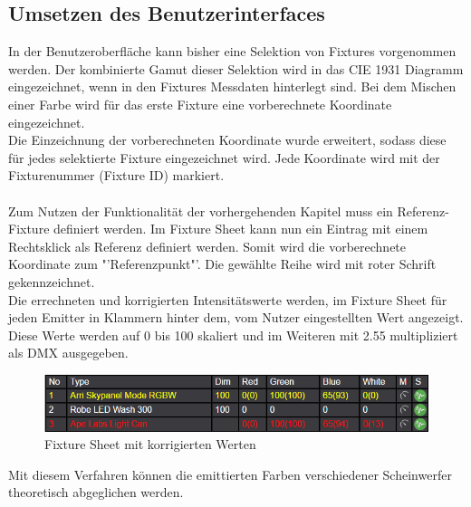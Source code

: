 \documentclass[11pt]{scrartcl}
\begin{document}
\subsection{Umsetzen des Benutzerinterfaces}
In der Benutzeroberfläche kann bisher eine Selektion von Fixtures vorgenommen werden. Der kombinierte Gamut dieser Selektion wird in das CIE 1931 Diagramm
eingezeichnet, wenn in den Fixtures Messdaten hinterlegt sind. Bei dem Mischen einer Farbe wird für das erste Fixture eine vorberechnete Koordinate
eingezeichnet.\\
Die Einzeichnung der vorberechneten Koordinate wurde erweitert, sodass diese für jedes selektierte Fixture eingezeichnet wird. Jede Koordinate wird mit
der Fixturenummer (Fixture ID) markiert.\\
\\
Zum Nutzen der Funktionalität der vorhergehenden Kapitel muss ein Referenz-Fixture definiert werden. Im Fixture Sheet kann nun ein Eintrag mit
einem Rechtsklick als Referenz definiert werden. Somit wird die vorberechnete Koordinate zum "'Referenzpunkt"'. Die gewählte Reihe wird mit roter
Schrift gekennzeichnet.\\
Die errechneten und korrigierten Intensitätswerte werden, im Fixture Sheet für jeden Emitter in Klammern hinter dem, vom Nutzer eingestellten Wert angezeigt.
Diese Werte werden auf 0 bis 100 skaliert und im Weiteren mit 2.55 multipliziert als DMX ausgegeben.
\begin{figure}[H]
    \begin{center}
        \includegraphics[width=\textwidth]{images/app_fixture_sheet_with_reference.png} %
    \end{center}
    \caption{Fixture Sheet mit korrigierten Werten}
\end{figure}
\noindent
Mit diesem Verfahren können die emittierten Farben verschiedener Scheinwerfer theoretisch abgeglichen werden.
\clearpage

\end{document}
